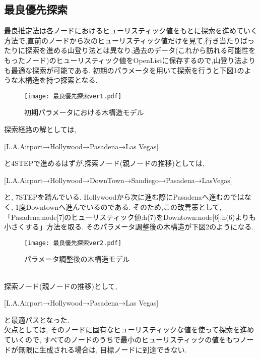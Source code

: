 \documentclass[uplatex,12pt]{jsarticle}
\begin{document}
\subsection{最良優先探索}
最良推定法は各ノードにおけるヒューリスティック値をもとに探索を進めていく方法で,直前のノードから次のヒューリスティック値だけを見て,行き当たりばったりに探索を進める山登り法とは異なり,過去のデータ(これから訪れる可能性をもったノード)のヒューリスティック値をOpenListに保存するので,山登り法よりも最適な探索が可能である. 初期のパラメータを用いて探索を行うと下図1のような木構造を持つ探索となる.
\begin{figure}[htbp]
 \begin{center}
  \texttt{[image: 最良優先探索ver1.pdf]}
 \end{center}
 \caption[]{初期パラメータにおける木構造モデル}\label{fig:fig1.1}
\end{figure}

探索経路の解としては,
\begin{center}
[L.A.Airport→Hollywood→Pasadena→Las Vegas]
\end{center}
と4STEPで進めるはずが,探索ノード(親ノードの推移)としては,
\begin{center}
[L.A.Airport→Hollywood→DownTown→Sandiego→Pasadena→LasVegas]
\end{center}
と, 7STEPを踏んでいる. Hollywoodから次に進む際にPasadenaへ進むのではなく, 1度Downtownへ進んでいるのである. そのため,この改善策として, 「Pasadena:node[7]のヒューリスティック値:h(7)をDowntown:node[6]:h(6)よりも小さくする」方法を取る. そのパラメータ調整後の木構造が下図2のようになる.
\begin{figure}[htbp]
 \begin{center}
  \texttt{[image: 最良優先探索ver2.pdf]}
 \end{center}
 \caption[]{パラメータ調整後の木構造モデル}\label{fig:fig1.2}
\end{figure}
\\
探索ノード(親ノードの推移)として,
\begin{center}
[L.A.Airport→Hollywood→Pasadena→Las Vegas]
\end{center}
と最適パスとなった.\\
欠点としては, そのノードに固有なヒューリスティックな値を使って探索を進めていくので, すべてのノードのうちで最小のヒューリスティックの値をもつノードが無限に生成される場合は, 目標ノードに到達できない.\\
\end{document}
